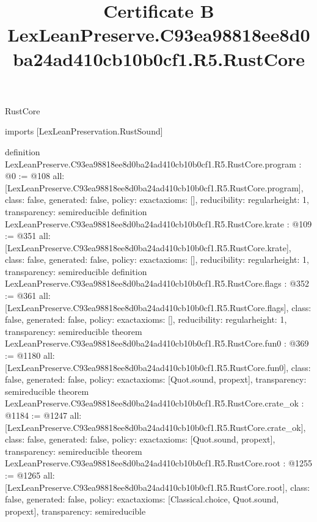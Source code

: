 \begin{lexlean}{RustCore}
\title{Certificate B LexLeanPreserve.C93ea98818ee8d0ba24ad410cb10b0cf1.R5.RustCore}
\begin{coremodule}
imports [LexLeanPreservation.RustSound]

definition LexLeanPreserve.C93ea98818ee8d0ba24ad410cb10b0cf1.R5.RustCore.program : @0 := @108 {
  all: [LexLeanPreserve.C93ea98818ee8d0ba24ad410cb10b0cf1.R5.RustCore.program],
  class: false,
  generated: false,
  policy: exact{axioms: []},
  reducibility: regular{height: 1},
  transparency: semireducible
}
definition LexLeanPreserve.C93ea98818ee8d0ba24ad410cb10b0cf1.R5.RustCore.krate : @109 := @351 {
  all: [LexLeanPreserve.C93ea98818ee8d0ba24ad410cb10b0cf1.R5.RustCore.krate],
  class: false,
  generated: false,
  policy: exact{axioms: []},
  reducibility: regular{height: 1},
  transparency: semireducible
}
definition LexLeanPreserve.C93ea98818ee8d0ba24ad410cb10b0cf1.R5.RustCore.flags : @352 := @361 {
  all: [LexLeanPreserve.C93ea98818ee8d0ba24ad410cb10b0cf1.R5.RustCore.flags],
  class: false,
  generated: false,
  policy: exact{axioms: []},
  reducibility: regular{height: 1},
  transparency: semireducible
}
theorem LexLeanPreserve.C93ea98818ee8d0ba24ad410cb10b0cf1.R5.RustCore.fun0 : @369 := @1180 {
  all: [LexLeanPreserve.C93ea98818ee8d0ba24ad410cb10b0cf1.R5.RustCore.fun0],
  class: false,
  generated: false,
  policy: exact{axioms: [Quot.sound, propext]},
  transparency: semireducible
}
theorem LexLeanPreserve.C93ea98818ee8d0ba24ad410cb10b0cf1.R5.RustCore.crate_ok : @1184 := @1247 {
  all: [LexLeanPreserve.C93ea98818ee8d0ba24ad410cb10b0cf1.R5.RustCore.crate_ok],
  class: false,
  generated: false,
  policy: exact{axioms: [Quot.sound, propext]},
  transparency: semireducible
}
theorem LexLeanPreserve.C93ea98818ee8d0ba24ad410cb10b0cf1.R5.RustCore.root : @1255 := @1265 {
  all: [LexLeanPreserve.C93ea98818ee8d0ba24ad410cb10b0cf1.R5.RustCore.root],
  class: false,
  generated: false,
  policy: exact{axioms: [Classical.choice, Quot.sound, propext]},
  transparency: semireducible
}


\end{coremodule}
\end{lexlean}
